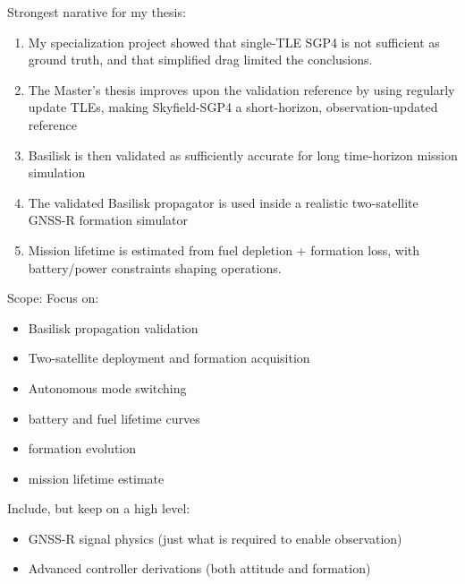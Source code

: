 Strongest narative for my thesis:
\begin{enumerate}
    \item My specialization project showed that single-TLE SGP4 is not sufficient as ground truth, and that simplified drag limited the conclusions.
    \item The Master's thesis improves upon the validation reference by using regularly update TLEs, making Skyfield-SGP4 a short-horizon, observation-updated reference
    \item Basilisk is then validated as sufficiently accurate for long time-horizon mission simulation
    \item The validated Basilisk propagator is used inside a realistic two-satellite GNSS-R formation simulator
    \item Mission lifetime is estimated from fuel depletion + formation loss, with battery/power constraints shaping operations.
\end{enumerate}

Scope:
Focus on:
\begin{itemize}
    \item Basilisk propagation validation
    \item Two-satellite deployment and formation acquisition
    \item Autonomous mode switching
    \item battery and fuel lifetime curves
    \item formation evolution
    \item mission lifetime estimate
\end{itemize}

Include, but keep on a high level:
\begin{itemize}
    \item GNSS-R signal physics (just what is required to enable observation)
    \item Advanced controller derivations (both attitude and formation)
\end{itemize}


